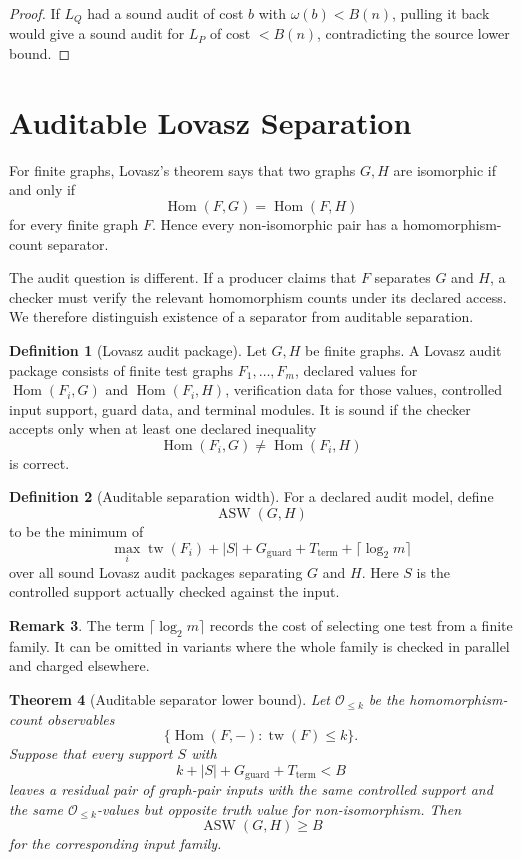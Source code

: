 \documentclass[11pt]{article}
\newtheorem{theorem}{Theorem}[section]
\theoremstyle{definition}
\newtheorem{definition}[theorem]{Definition}
\newtheorem{remark}[theorem]{Remark}
\DeclareMathOperator{\ASW}{ASW}
\DeclareMathOperator{\Hom}{Hom}
\DeclareMathOperator{\tw}{tw}
\begin{document}
\begin{proof}
If \(L_Q\) had a sound audit of cost \(b\) with \(\omega(b)<B(n)\), pulling it back would give a sound audit for \(L_P\) of cost \(<B(n)\), contradicting the source lower bound.
\end{proof}

\section{Auditable Lovasz Separation}

For finite graphs, Lovasz's theorem says that two graphs \(G,H\) are isomorphic if and only if
\[
\Hom(F,G)=\Hom(F,H)
\]
for every finite graph \(F\). Hence every non-isomorphic pair has a homomorphism-count separator.

The audit question is different. If a producer claims that \(F\) separates \(G\) and \(H\), a checker must verify the relevant homomorphism counts under its declared access. We therefore distinguish existence of a separator from auditable separation.

\begin{definition}[Lovasz audit package]
Let \(G,H\) be finite graphs. A Lovasz audit package consists of finite test graphs \(F_1,\ldots,F_m\), declared values for \(\Hom(F_i,G)\) and \(\Hom(F_i,H)\), verification data for those values, controlled input support, guard data, and terminal modules. It is sound if the checker accepts only when at least one declared inequality
\[
\Hom(F_i,G)\neq \Hom(F_i,H)
\]
is correct.
\end{definition}

\begin{definition}[Auditable separation width]
For a declared audit model, define
\[
\ASW(G,H)
\]
to be the minimum of
\[
\max_i\tw(F_i)
+|S|+G_{\mathrm{guard}}+T_{\mathrm{term}}+\lceil\log_2 m\rceil
\]
over all sound Lovasz audit packages separating \(G\) and \(H\). Here \(S\) is the controlled support actually checked against the input.
\end{definition}

\begin{remark}
The term \(\lceil\log_2 m\rceil\) records the cost of selecting one test from a finite family. It can be omitted in variants where the whole family is checked in parallel and charged elsewhere.
\end{remark}

\begin{theorem}[Auditable separator lower bound]
Let \(\mathcal O_{\leq k}\) be the homomorphism-count observables
\[
\{\Hom(F,-):\tw(F)\leq k\}.
\]
Suppose that every support \(S\) with
\[
k+|S|+G_{\mathrm{guard}}+T_{\mathrm{term}}<B
\]
leaves a residual pair of graph-pair inputs with the same controlled support and the same \(\mathcal O_{\leq k}\)-values but opposite truth value for non-isomorphism. Then
\[
\ASW(G,H)\geq B
\]
for the corresponding input family.
\end{theorem}
\end{document}
